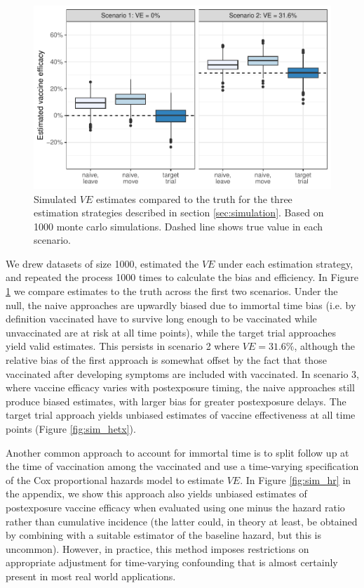 \documentclass[11pt]{article}
\begin{document}
\begin{figure}[t]
  \centering
  \includegraphics{../3_figures/sim_rr.pdf}
  \caption{Simulated $VE$ estimates compared to the truth for the three estimation strategies described in section \ref{sec:simulation}. Based on 1000 monte carlo simulations. Dashed line shows true value in each scenario. \label{fig:sim_results}}
\end{figure}

We drew datasets of size 1000, estimated the $VE$ under each estimation strategy, and repeated the process 1000 times to calculate the bias and efficiency. In Figure \ref{fig:sim_results} we compare estimates to the truth across the first two scenarios. Under the null, the naive approaches are upwardly biased due to immortal time bias (i.e. by definition vaccinated have to survive long enough to be vaccinated while unvaccinated are at risk at all time points), while the target trial approaches yield valid estimates. This persists in scenario 2 where $VE = 31.6\%$, although the relative bias of the first approach is somewhat offset by the fact that those vaccinated after developing symptoms are included with vaccinated. In scenario 3, where vaccine efficacy varies with postexposure timing, the naive approaches still produce biased estimates, with larger bias for greater postexposure delays. The target trial approach yields unbiased estimates of vaccine effectiveness at all time points (Figure \ref{fig:sim_hetx}). 

Another common approach to account for immortal time is to split follow up at the time of vaccination among the vaccinated and use a time-varying specification of the Cox proportional hazards model to estimate $VE$. In Figure \ref{fig:sim_hr} in the appendix, we show this approach also yields unbiased estimates of postexposure vaccine efficacy when evaluated using one minus the hazard ratio rather than cumulative incidence (the latter could, in theory at least, be obtained by combining with a suitable estimator of the baseline hazard, but this is uncommon). However, in practice, this method imposes restrictions on appropriate adjustment for time-varying confounding that is almost certainly present in most real world applications. 
\end{document}
